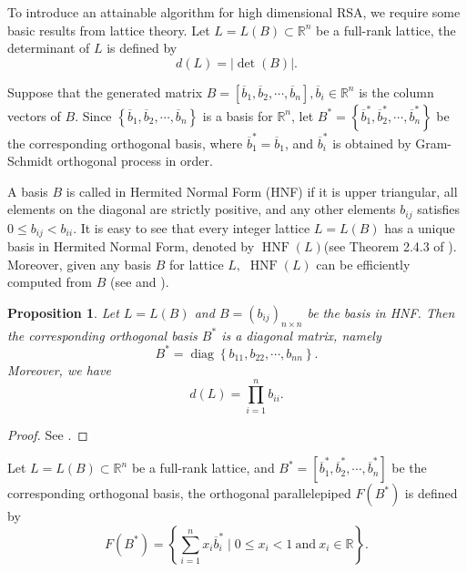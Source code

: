 \documentclass [11pt]{article}
\newtheorem{prop}[thm]{\bf{Proposition}}
\begin{document}
To introduce an attainable algorithm for high dimensional RSA, we require some basic results from lattice theory. Let $L=L(B)\subset \mathbb{R}^{n}$ be a full-rank lattice, the determinant of $L$ is defined by
\begin{equation}\label{3.6}
d(L)=|\operatorname{det}(B)|.
\end{equation}

Suppose that the generated matrix $B=\left[\overline{b}_{1}, \overline{b}_{2}, \cdots, \overline{b}_{n}\right], \overline{b}_{i} \in \mathbb{R}^{n}$ is the column vectors of $B$. Since $\left\{\overline{b}_{1}, \overline{b}_{2}, \cdots, \overline{{b}}_{n}\right\}$ is a basis for $\mathbb{R}^{n}$, let $B^{*}=\left\{\overline{b}_{1}^{*}, \overline{b}_{2}^{*}, \cdots, \overline{b}_{n}^{*}\right\}$ be the corresponding orthogonal basis, where $\overline{b}_{1}^{*}=\overline{b}_{1}$, and  $\overline{b}_{i}^{*} $ is obtained by Gram-Schmidt orthogonal process in order.

A basis $B$ is called in Hermited Normal Form (HNF) if it is upper triangular, all elements on the diagonal are strictly positive, and any other elements $b_{i j}$ satisfies $0 \leq b_{i j}<b_{i i}$. It is easy to see that every integer lattice $L=L(B)$ has a unique basis in Hermited Normal Form,  denoted by $\operatorname{HNF}(L)$(see Theorem 2.4.3 of \cite{C2}). Moreover, given any basis $B$ for lattice $L,$ $ \operatorname{HNF}(L)$ can be efficiently computed from $B$ (see \cite{M4} and \cite{C2}).

\begin{prop}\label{pp1}
Let $L=L(B)$  and $B=(b_{ij})_{n\times n}$ be the basis in HNF. Then the corresponding orthogonal basis $B^{*}$ is a diagonal matrix, namely
\begin{equation}\label{3.7}
B^{*}=\operatorname{diag}\left\{b_{11}, b_{22}, \cdots, b_{nn}\right\}.
\end{equation}
Moreover, we have
\begin{equation}\label{3.8}
d(L)=\prod_{i=1}^{n} b_{i i}.
\end{equation}
\end{prop}
\begin{proof}
See \cite{M4}.
\end{proof}

\begin{def}\label{df3.1}
Let $L=L(B)\subset \mathbb{R}^{n}$ be a full-rank lattice, and $B^{*}=\left[\overline{b}_{1}^{*}, \overline{b}_{2}^{*}, \cdots, \overline{b}_{n}^{*}\right]$ be the corresponding  orthogonal basis, the orthogonal  parallelepiped $F\left(B^{*}\right)$ is defined by
\begin{equation}\label{3.9}
F( B^{*})=\left\{\sum_{i=1}^{n} x_{ i}\overline{b}_{i}^{*} \mid 0\leq x_{i}<1 \ \text{and}\ x_{i}\in \mathbb{R}\right\}.
\end{equation}
\end{def}
\end{document}
